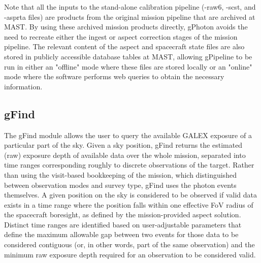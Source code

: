 \documentclass[preprint]{aastex}
\begin{document}
Note that all the inputs to the stand-alone calibration pipeline (-raw6, -scst, and -asprta files) are products from the original mission pipeline that are archived at MAST. By using these archived mission products directly, gPhoton avoids the need to recreate either the ingest or aspect correction stages of the mission pipeline. The relevant content of the aspect and spacecraft state files are also stored in publicly accessible database tables at MAST, allowing gPipeline to be run in either an "offline" mode where these files are stored locally or an "online" mode where the software performs web queries to obtain the necessary information.

\subsection{gFind}
\label{gfind}
The gFind module allows the user to query the available GALEX exposure of a particular part of the sky. Given a sky position, gFind returns the estimated (raw) exposure depth of available data over the whole mission, separated into time ranges corresponding roughly to discrete observations of the target. Rather than using the visit-based bookkeeping of the mission, which distinguished between observation modes and survey type, gFind uses the photon events themselves. A given position on the sky is considered to be observed if valid data exists in a time range where the position falls within one effective FoV radius of the spacecraft boresight, as defined by the mission-provided aspect solution. Distinct time ranges are identified based on user-adjustable parameters that define the maximum allowable gap between two events for those data to be considered contiguous (or, in other words, part of the same observation) and the minimum raw exposure depth required for an observation to be considered valid.
\end{document}
